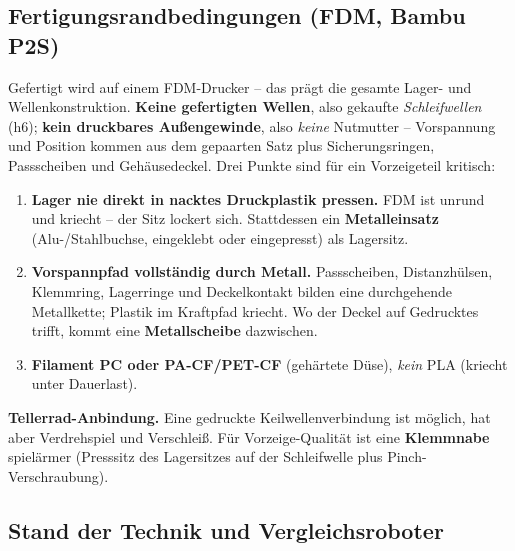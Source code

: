 \subsection{Fertigungsrandbedingungen (FDM, Bambu P2S)}
\label{sec:ttr-arm-fdm}

Gefertigt wird auf einem FDM-Drucker -- das pr\"agt die gesamte Lager- und
Wellenkonstruktion. \textbf{Keine gefertigten Wellen}, also gekaufte
\emph{Schleifwellen} (h6); \textbf{kein druckbares Au\ss engewinde}, also
\emph{keine} Nutmutter -- Vorspannung und Position kommen aus dem gepaarten Satz
plus Sicherungsringen, Passscheiben und Geh\"ausedeckel. Drei Punkte sind f\"ur
ein Vorzeigeteil kritisch:
\begin{enumerate}
  \item \textbf{Lager nie direkt in nacktes Druckplastik pressen.} FDM ist unrund
        und kriecht -- der Sitz lockert sich. Stattdessen ein
        \textbf{Metalleinsatz} (Alu-/Stahlbuchse, eingeklebt oder eingepresst) als
        Lagersitz.
  \item \textbf{Vorspannpfad vollst\"andig durch Metall.} Passscheiben,
        Distanzh\"ulsen, Klemmring, Lagerringe und Deckelkontakt bilden eine
        durchgehende Metallkette; Plastik im Kraftpfad kriecht. Wo der Deckel auf
        Gedrucktes trifft, kommt eine \textbf{Metallscheibe} dazwischen.
  \item \textbf{Filament PC oder PA-CF/PET-CF} (geh\"artete D\"use), \emph{kein}
        PLA (kriecht unter Dauerlast).
\end{enumerate}
\textbf{Tellerrad-Anbindung.} Eine gedruckte Keilwellenverbindung ist m\"oglich,
hat aber Verdrehspiel und Verschlei\ss. F\"ur Vorzeige-Qualit\"at ist eine
\textbf{Klemmnabe} spiel\"armer (Presssitz des Lagersitzes auf der Schleifwelle
plus Pinch-Verschraubung).

\subsection{Stand der Technik und Vergleichsroboter}
\label{sec:ttr-arm-sdt}

